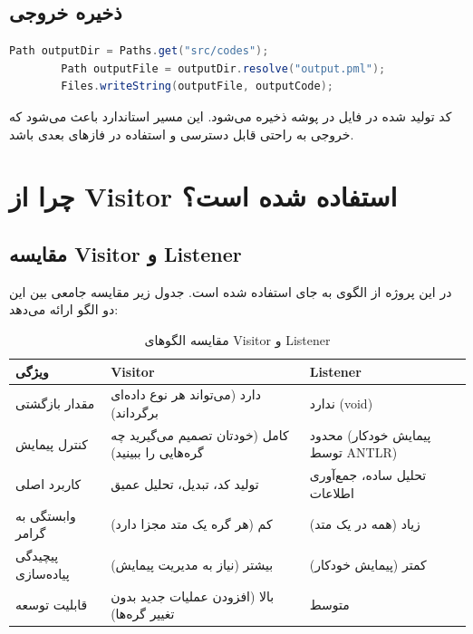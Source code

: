 \documentclass[12pt]{report}
\begin{document}
	\section{ذخیره خروجی}
	
	\setLTR
	\begin{lstlisting}[language=Java]
		Path outputDir = Paths.get("src/codes");
		Path outputFile = outputDir.resolve("output.pml");
		Files.writeString(outputFile, outputCode);
	\end{lstlisting}
	\setRTL
	
	کد تولید شده در فایل  در پوشه  ذخیره می‌شود. این مسیر استاندارد باعث می‌شود که خروجی به راحتی قابل دسترسی و استفاده در فازهای بعدی باشد.
	
	\chapter{چرا از Visitor استفاده شده است؟}
	
	\section{مقایسه Visitor و Listener}
	
	در این پروژه از الگوی  به جای  استفاده شده است. جدول زیر مقایسه جامعی بین این دو الگو ارائه می‌دهد:
	
	\begin{table}[h!]
		\centering
		\begin{tabular}{|p{4cm}|p{5cm}|p{5cm}|}
			\hline
			\textbf{ویژگی} & \textbf{Visitor} & \textbf{Listener} \\
			\hline
			مقدار بازگشتی & دارد (می‌تواند هر نوع داده‌ای برگرداند) & ندارد (void) \\
			کنترل پیمایش & کامل (خودتان تصمیم می‌گیرید چه گره‌هایی را ببینید) & محدود (پیمایش خودکار توسط ANTLR) \\
			کاربرد اصلی & تولید کد، تبدیل، تحلیل عمیق & تحلیل ساده، جمع‌آوری اطلاعات \\
			وابستگی به گرامر & کم (هر گره یک متد مجزا دارد) & زیاد (همه در یک متد) \\
			پیچیدگی پیاده‌سازی & بیشتر (نیاز به مدیریت پیمایش) & کمتر (پیمایش خودکار) \\
			قابلیت توسعه & بالا (افزودن عملیات جدید بدون تغییر گره‌ها) & متوسط \\
			\hline
		\end{tabular}
		\caption{مقایسه الگوهای Visitor و Listener}
	\end{table}
	
\end{document}
